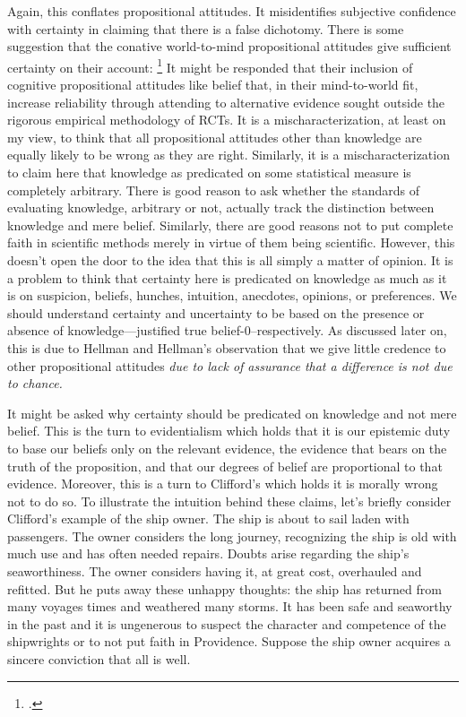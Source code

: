 \documentclass[letterpaper,notitlepage,12pt]{article}
\begin{document}
Again, this conflates propositional attitudes.
It misidentifies subjective confidence with certainty in claiming that there is
a false dichotomy.
There is some suggestion that the conative world-to-mind propositional attitudes
give sufficient certainty on their account: \footcite[p.
1586]{hellman_mice_1991}
It might be responded that their inclusion of cognitive propositional attitudes
like belief that, in their mind-to-world fit, increase reliability through
attending to alternative evidence sought outside the rigorous empirical
methodology of RCTs.
It is a mischaracterization, at least on my view, to think that all
propositional attitudes other than knowledge are equally likely to be wrong as
they are right.
Similarly, it is a mischaracterization to claim here that knowledge as
predicated on some statistical measure is completely arbitrary.
There is good reason to ask whether the standards of evaluating knowledge,
arbitrary or not, actually track the distinction between knowledge and mere
belief.
Similarly, there are good reasons not to put complete faith in scientific
methods merely in virtue of them being scientific.
However, this doesn't open the door to the idea that this is all simply a matter
of opinion.
It is a problem to think that certainty here is predicated on knowledge as much
as it is on suspicion, beliefs, hunches, intuition, anecdotes, opinions, or
preferences.
We should understand certainty and uncertainty to be based on the presence or
absence of knowledge---justified true belief-0--respectively.
As discussed later on, this is due to Hellman and Hellman's observation that we
give little credence to other propositional attitudes \textit{due to lack of
assurance that a difference is not due to chance.}

It might be asked why certainty should be predicated on knowledge and not mere
belief.
This is the turn to evidentialism which holds that it is our epistemic duty to
base our beliefs only on the relevant evidence, the evidence that bears on the
truth of the proposition, and that our degrees of belief are proportional to
that evidence.
Moreover, this is a turn to Clifford's  which holds
it is morally wrong not to do so.
To illustrate the intuition behind these claims, let's briefly consider
Clifford's example of the ship owner.
The ship is about to sail laden with passengers.
The owner considers the long journey, recognizing the ship is old with much use and
has often needed repairs.
Doubts arise regarding the ship's seaworthiness.
The owner considers having it, at great cost, overhauled and refitted.
But he puts away these unhappy thoughts: the ship has returned from many voyages
times and weathered many storms.
It has been safe and seaworthy in the past and it is ungenerous to suspect the
character and competence of the shipwrights or to not put faith in Providence.
Suppose the ship owner acquires a sincere conviction that all is well.
\end{document}
